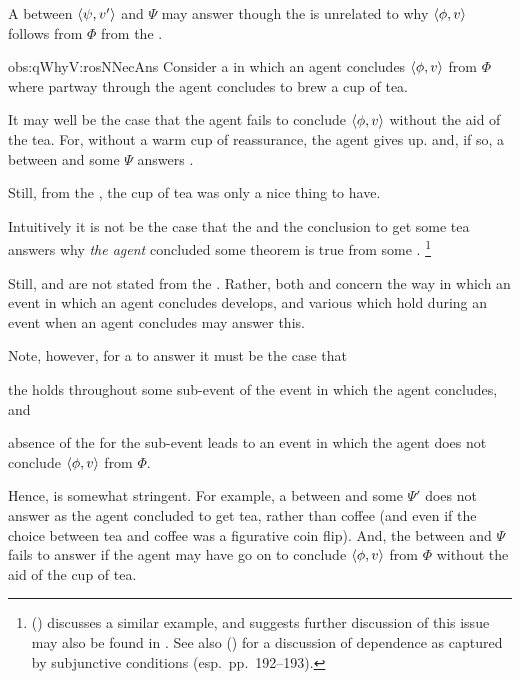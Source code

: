 \begin{note}
  \begin{observation}%
    \label{obs:qWhyV:rosNNecAns}%
    A \ros{} between \(\langle \psi, v' \rangle\) and \(\Psi\) may answer \qWhyV{} though the \ros{} is unrelated to why \(\langle \phi, v \rangle\) follows from \(\Phi\) from the \agpe{\agents{}}.
  \end{observation}

  \begin{motivation}{obs:qWhyV:rosNNecAns}
    Consider a  in which an agent concludes \(\langle \phi, v \rangle\) from \(\Phi\) where partway through the agent concludes to brew a cup of tea.

    It may well be the case that the agent fails to conclude \(\langle \phi, v \rangle\) without the aid of the tea.
    For, without a warm cup of reassurance, the agent gives up.
    and, if so, a \ros{} between  and some \pool{} \(\Psi\) answers \qWhyV{}.

    Still, from the \agpe{\agents{}}, the cup of tea was only a nice thing to have.
  \end{motivation}

  \noindent%
  Intuitively it is not be the case that the \ros{} and the conclusion to get some tea answers why \emph{the agent} concluded some theorem is true from some \pool{}.%
    \footnote{
      \citeauthor{Armstrong:1968vh} (\citeyear[195--196]{Armstrong:1968vh}) discusses a similar example, and suggests further discussion of this issue may also be found in \textcite{Moore:1962up}.
      See also \citeauthor{Sanford:1989aa} (\citeyear{Sanford:1989aa}) for a discussion of dependence as captured by subjunctive conditions (esp.\ pp.\ 192--193).
    }

    Still, \qWhy{} and \qWhyV{} are not stated from the \agpe{\agents{}}.
    Rather, both \qWhy{} and \qWhyV{} concern the way in which an event in which an agent concludes develops, and various \ros{} which hold during an event when an agent concludes may answer this.

    Note, however, for a \ros{} to answer \qWhyV{} it must be the case that
    \begin{enumerate*}[label=(\alph*), ref=(\alph*)]
    \item
      the \ros{} holds throughout some sub-event of the event in which the agent concludes, and
    \item
      absence of the \ros{} for the sub-event leads to an event in which the agent does not conclude \(\langle \phi, v \rangle\) from \(\Phi\).
    \end{enumerate*}

    Hence, \qWhy{} is somewhat stringent.
    For example, a \ros{} between  and some \pool{} \(\Psi'\) does not answer \qWhyV{} as the agent concluded to get tea, rather than coffee (and even if the choice between tea and coffee was a figurative coin flip).
    And, the \ros{} between  and \(\Psi\) fails to answer \qWhyV{} if the agent may have go on to conclude \(\langle \phi, v \rangle\) from \(\Phi\) without the aid of the cup of tea.
\end{note}


